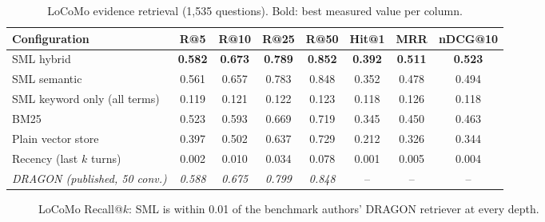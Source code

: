 \documentclass[11pt,a4paper]{article}
\newcommand{\sys}{SML}
\newcommand{\best}[1]{\textbf{#1}}
\begin{document}
\begin{table}[htbp]
\centering
\small
\caption{LoCoMo evidence retrieval (1{,}535 questions). Bold: best measured value per column.}
\label{tab:locomo}
\begin{tabular}{@{}lccccccc@{}}
\toprule
Configuration & R@5 & R@10 & R@25 & R@50 & Hit@1 & MRR & nDCG@10 \\
\midrule
\sys{} hybrid & \best{0.582} & \best{0.673} & \best{0.789} & \best{0.852} & \best{0.392} & \best{0.511} & \best{0.523} \\
\sys{} semantic & 0.561 & 0.657 & 0.783 & 0.848 & 0.352 & 0.478 & 0.494 \\
\sys{} keyword only (all terms) & 0.119 & 0.121 & 0.122 & 0.123 & 0.118 & 0.126 & 0.118 \\
BM25 & 0.523 & 0.593 & 0.669 & 0.719 & 0.345 & 0.450 & 0.463 \\
Plain vector store & 0.397 & 0.502 & 0.637 & 0.729 & 0.212 & 0.326 & 0.344 \\
Recency (last $k$ turns) & 0.002 & 0.010 & 0.034 & 0.078 & 0.001 & 0.005 & 0.004 \\
\midrule
\textit{DRAGON (published, 50 conv.)} & \textit{0.588} & \textit{0.675} & \textit{0.799} & \textit{0.848} & -- & -- & -- \\
\bottomrule
\end{tabular}
\end{table}

\begin{figure}[htbp]
\centering
{}
\caption{LoCoMo Recall@$k$: \sys{} is within 0.01 of the benchmark authors' DRAGON retriever at every depth.}
\label{fig:locomo}
\end{figure}
\end{document}
